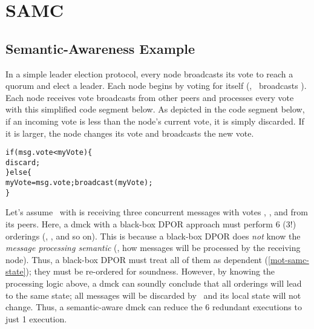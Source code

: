 \section{SAMC}
\label{sam-samc}

\subsection{Semantic-Awareness Example}
\label{sec-samc-semantic}

In a simple leader election protocol, every node broadcasts its vote to reach a
quorum and elect a leader.  Each node begins by voting for itself (\eg, \ntwo\
broadcasts ).  Each node receives vote broadcasts from other peers
and processes every vote with this simplified code segment below.  As depicted
in the code segment below, if an incoming vote is less than the node's current
vote, it is simply discarded.  If it is larger, the node changes its vote and
broadcasts the new vote.

\begin{minipage}{\textwidth}
\begin{alltt}
\vfive
     if (msg.vote < myVote) \{
       discard;
     \} else \{
       myVote = msg.vote; broadcast(myVote);
     \}
\end{alltt}
\vfive
\end{minipage}



Let's assume \nfour\ with  is receiving three concurrent messages
with votes \ts{1}, \ts{2}, and \ts{3} from its peers.  Here, a dmck with a
black-box DPOR approach must perform 6 (3!) orderings (\ts{123}, \ts{132}, and
so on).  This is because a black-box DPOR does {\em not} know the {\em message
processing semantic} (\ie, how messages will be processed by the receiving
node).  Thus, a black-box DPOR must treat all of them as dependent
(\sec\ref{mot-samc-state}); they must be re-ordered for soundness.  However, by
knowing the processing logic above, a dmck can soundly conclude that all
orderings will lead to the same state; all messages will be discarded by \nfour\
and its local state will not change.  Thus, a semantic-aware dmck can reduce the
6 redundant executions to just 1 execution.


